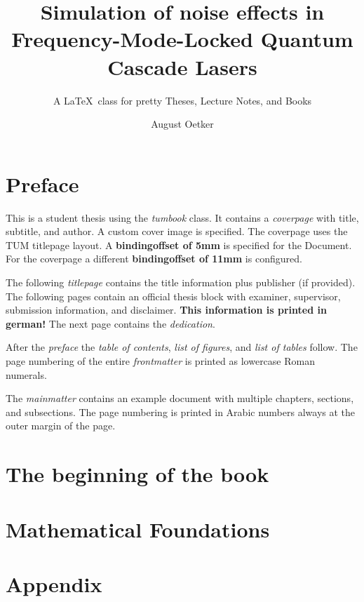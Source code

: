 \documentclass[thesis=student,german,BCOR=5mm,coverBCOR=11mm]{tumbook}
\title{Simulation of noise effects in Frequency-Mode-Locked
  Quantum Cascade Lasers}
\subtitle{A \LaTeX\ class for pretty Theses, Lecture Notes, and Books}
\author{August Oetker}
\begin{document}
\frontmatter
\maketitle

\chapter{Preface}
 {\color{TUMOrange}This is a student thesis using the \emph{tumbook} class.
  It contains a \emph{coverpage} with title, subtitle, and author.
  A custom cover image is specified. The coverpage uses the TUM
  titlepage layout. A \textbf{bindingoffset of 5mm} is specified for the
  Document. For the coverpage a different \textbf{bindingoffset of 11mm} is
  configured.\par
  The following \emph{titlepage} contains the title information plus publisher
  (if provided). The following pages contain an official thesis block
  with examiner, supervisor, submission information, and disclaimer.
  \textbf{This information is printed in german!}
  The next page contains the \emph{dedication}.\par
  After the \emph{preface} the \emph{table of contents},
  \emph{list of figures}, and \emph{list of tables} follow.
  The page numbering of the entire \emph{frontmatter} is printed as
  lowercase Roman numerals.\par
  The \emph{mainmatter} contains an example document with multiple chapters,
  sections, and subsections. The page numbering is printed in Arabic numbers
  always at the outer margin of the page.
 }

\lipsum[1-4]
\cleardoublepage

\tableofcontents
\listoffigures
\listoftables

\mainmatter
\chapter{The beginning of the book}


\chapter{Mathematical Foundations}


\appendix
\chapter{Appendix}


\backmatter


\end{document}
